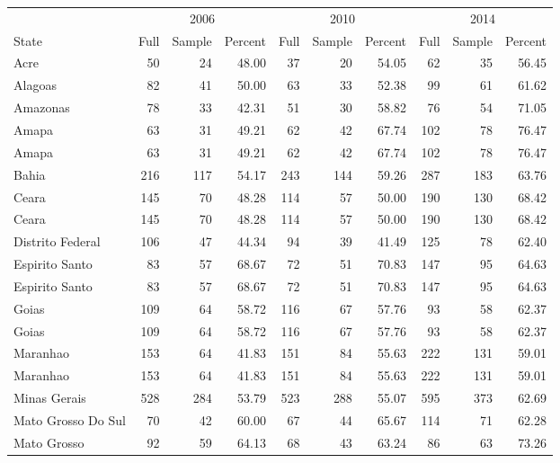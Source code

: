 \documentclass[12pt,english]{article}
\numberwithin{equation}{section}
\theoremstyle{plain}
\theoremstyle{remark}
\theoremstyle{plain}
\begin{document}
\newpage

\begin{table}[H]
  \centering\begingroup\fontsize{8}{10}\selectfont
  
  \begin{tabular}{lrrrrrrrrr}
  \toprule
  \multicolumn{1}{c}{ } & \multicolumn{3}{c}{2006} & \multicolumn{3}{c}{2010} & \multicolumn{3}{c}{2014} \\
  \cmidrule(l{3pt}r{3pt}){2-4} \cmidrule(l{3pt}r{3pt}){5-7} \cmidrule(l{3pt}r{3pt}){8-10}
  State & Full & Sample & Percent & Full & Sample & Percent & Full & Sample & Percent\\
  \midrule
  Acre & 50 & 24 & 48.00 & 37 & 20 & 54.05 & 62 & 35 & 56.45\\
  Alagoas & 82 & 41 & 50.00 & 63 & 33 & 52.38 & 99 & 61 & 61.62\\
  Amazonas & 78 & 33 & 42.31 & 51 & 30 & 58.82 & 76 & 54 & 71.05\\
  Amapa & 63 & 31 & 49.21 & 62 & 42 & 67.74 & 102 & 78 & 76.47\\
  Amapa & 63 & 31 & 49.21 & 62 & 42 & 67.74 & 102 & 78 & 76.47\\
  \addlinespace
  Bahia & 216 & 117 & 54.17 & 243 & 144 & 59.26 & 287 & 183 & 63.76\\
  Ceara & 145 & 70 & 48.28 & 114 & 57 & 50.00 & 190 & 130 & 68.42\\
  Ceara & 145 & 70 & 48.28 & 114 & 57 & 50.00 & 190 & 130 & 68.42\\
  Distrito Federal & 106 & 47 & 44.34 & 94 & 39 & 41.49 & 125 & 78 & 62.40\\
  Espirito Santo & 83 & 57 & 68.67 & 72 & 51 & 70.83 & 147 & 95 & 64.63\\
  \addlinespace
  Espirito Santo & 83 & 57 & 68.67 & 72 & 51 & 70.83 & 147 & 95 & 64.63\\
  Goias & 109 & 64 & 58.72 & 116 & 67 & 57.76 & 93 & 58 & 62.37\\
  Goias & 109 & 64 & 58.72 & 116 & 67 & 57.76 & 93 & 58 & 62.37\\
  Maranhao & 153 & 64 & 41.83 & 151 & 84 & 55.63 & 222 & 131 & 59.01\\
  Maranhao & 153 & 64 & 41.83 & 151 & 84 & 55.63 & 222 & 131 & 59.01\\
  \addlinespace
  Minas Gerais & 528 & 284 & 53.79 & 523 & 288 & 55.07 & 595 & 373 & 62.69\\
  Mato Grosso Do Sul & 70 & 42 & 60.00 & 67 & 44 & 65.67 & 114 & 71 & 62.28\\
  Mato Grosso & 92 & 59 & 64.13 & 68 & 43 & 63.24 & 86 & 63 & 73.26\\

\end{tabular}
\end{table}
\end{document}
